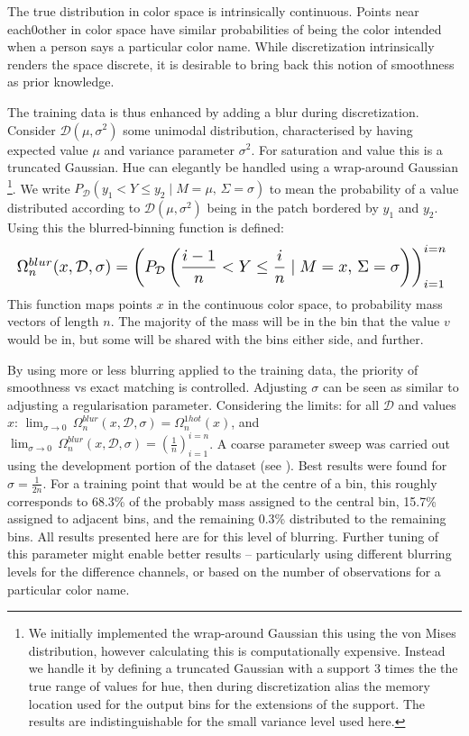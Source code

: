 \documentclass[11pt,letterpaper]{article}
\begin{document}
The true distribution in color space is intrinsically continuous.
Points near each0other in color space have similar probabilities of being the color intended when a person says a particular color name.
While discretization intrinsically renders the space discrete, it is desirable to bring back this notion of smoothness as prior knowledge.

The training data is thus enhanced by adding a blur during discretization.
Consider $\mathcal{D}(\mu,\sigma^{2})$ some unimodal distribution, characterised by having expected value $\mu$ and variance parameter $\sigma^{2}$.
For saturation and value this is a truncated Gaussian.
Hue can elegantly be handled using a wrap-around Gaussian%
\footnote{We initially implemented the wrap-around Gaussian this using 
 the von Mises distribution, however calculating this is computationally expensive.
Instead we handle it by defining a truncated Gaussian with a support 3 times the the true range of values for hue, then during discretization alias the memory location used for the output bins for the extensions of the support.
The results are indistinguishable for the small variance level used here.}.
We write $P_{\mathcal{D}}(y_{1}<Y\le y_{2}\mid M=\mu,\,\Sigma=\sigma)$ to mean the probability of a value distributed according to $\mathcal{D}(\mu,\sigma^{2})$ being in the patch bordered by $y_1$ and $y_2$.
Using this the blurred-binning function is defined: 
%
\begin{equation*}%
\resizebox{\columnwidth}{!}{%
$\Omega_{n}^{blur}(x,\mathcal{D},\sigma)=\left(P_{\mathcal{D}}\left(\dfrac{i-1}{n}<Y\le\dfrac{i}{n}\mid M=x,\,\Sigma=\sigma\right)\right)_{i=1}^{i=n}$
}%
\end{equation*}
This function maps points $x$ in the continuous color space, to probability mass vectors of length $n$.
The majority of the mass will be in the bin that the value $v$ would be in,
but some will be shared with the bins either side, and further.

By using more or less blurring applied to the training data, the priority of smoothness vs exact matching is controlled.
Adjusting $\sigma$ can be seen as similar to adjusting a regularisation parameter.
Considering the limits:
for all $\mathcal{D}$ and values $x$: 
$\displaystyle\lim_{\sigma \to 0}\, \Omega_n^{blur}(x, \mathcal{D}, \sigma) = \Omega_n^{1hot}(x)$,
and $\displaystyle\lim_{\sigma \to 0}\, \Omega_n^{blur}(x, \mathcal{D}, \sigma) =  \left(\frac{1}{n}\right)_{i=1}^{i=n}$.
A coarse parameter sweep was carried out using the development portion of the dataset (see ).
Best results were found for $\sigma = \frac{1}{2n}$.
For a training point that would be at the centre of a bin, this roughly corresponds to 68.3\% of the probably mass assigned to the central bin, 15.7\% assigned to adjacent bins, and the remaining 0.3\% distributed to the remaining bins.
All results presented here are for this level of blurring.
Further tuning of this parameter might enable better results -- particularly using different blurring levels for the difference channels, or based on the number of observations for a particular color name.
\end{document}
